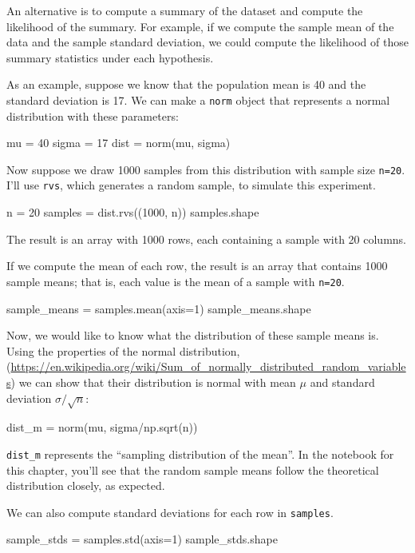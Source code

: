 \documentclass[12pt]{book}
\theoremstyle{exercise}
\newcommand{\py}[1]{{\tt #1}}%
\begin{document}
An alternative is to compute a summary of the dataset and compute the
likelihood of the summary. For example, if we compute the sample mean of
the data and the sample standard deviation, we could compute the
likelihood of those summary statistics under each hypothesis.

As an example, suppose we know that the population mean is 40 and the
standard deviation is 17. We can make a \py{norm}
object that represents a normal distribution with these parameters:

\begin{code}
mu = 40
sigma = 17
dist = norm(mu, sigma)
\end{code}

Now suppose we draw 1000 samples from this distribution with sample size
\py{n=20}. I'll use \py{rvs},
which generates a random sample, to simulate this experiment.

\begin{code}
n = 20
samples = dist.rvs((1000, n))
samples.shape
\end{code}

The result is an array with 1000 rows, each containing a sample with 20
columns.

If we compute the mean of each row, the result is an array that contains
1000 sample means; that is, each value is the mean of a sample with
\py{n=20}.

\begin{code}
sample_means = samples.mean(axis=1)
sample_means.shape
\end{code}

Now, we would like to know what the distribution of these sample means
is. Using the properties of the normal distribution,
(\url{https://en.wikipedia.org/wiki/Sum_of_normally_distributed_random_variables}) we
can show that their distribution is normal with mean $\mu$ and
standard deviation $\sigma/\sqrt{n}$:

\begin{code}
dist_m = norm(mu, sigma/np.sqrt(n))
\end{code}

\py{dist_m} represents the ``sampling distribution
of the mean''.
In the notebook for this chapter, you'll see that the random sample means follow the theoretical
distribution closely, as expected.

We can also compute standard deviations for each row in
\py{samples}.

\begin{code}
sample_stds = samples.std(axis=1)
sample_stds.shape
\end{code}
\end{document}
